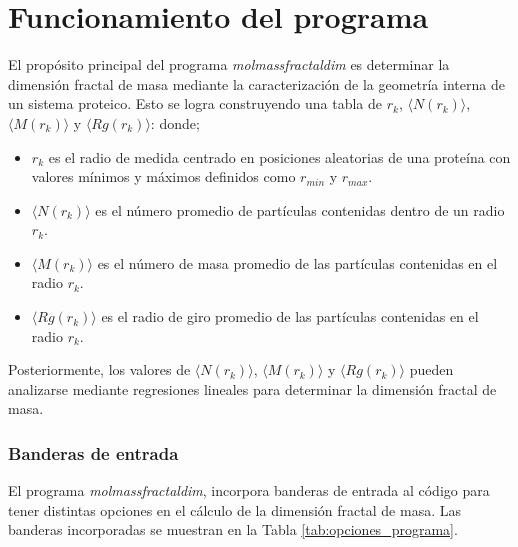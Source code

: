 \chapter{Funcionamiento del programa}

\color{blue}

El propósito principal del programa \textit{molmassfractaldim} es determinar la dimensi\'{o}n fractal de masa mediante la caracterizaci\'{o}n de la geometría interna de un sistema proteico. Esto se logra construyendo una tabla de $r_{k}$, $\langle N(r_k) \rangle$, $\langle M(r_k) \rangle$ y $\langle Rg(r_k) \rangle$: donde;

\begin{itemize}
	\item $r_{k}$ es el radio de medida centrado en posiciones aleatorias de una prote\'{i}na con valores m\'{i}nimos y m\'{a}ximos definidos como $r_{min}$ y $r_{max}$.
	\item $\langle N(r_k) \rangle$ es el número promedio de partículas contenidas dentro de un radio $r_{k}$. 
	\item  $\langle M(r_k) \rangle$ es el n\'{u}mero de masa promedio de las part\'{i}culas contenidas en el radio $r_{k}$.
	\item  $\langle Rg(r_k) \rangle$ es el radio de giro promedio de las part\'{i}culas contenidas en el radio $r_{k}$.
\end{itemize}

Posteriormente, los valores de $\langle N(r_k) \rangle$, $\langle M(r_k) \rangle$ y $\langle Rg(r_k) \rangle$ pueden analizarse mediante regresiones lineales para determinar la dimensi\'{o}n fractal de masa.


	\clearpage

\subsection*{Banderas de entrada}

	El programa \emph{molmassfractaldim}, incorpora banderas de entrada al c\'{o}digo para tener distintas opciones en el c\'{a}lculo de la dimensi\'{o}n fractal de masa. Las banderas incorporadas se muestran en la Tabla \ref{tab:opciones_programa}.
	

